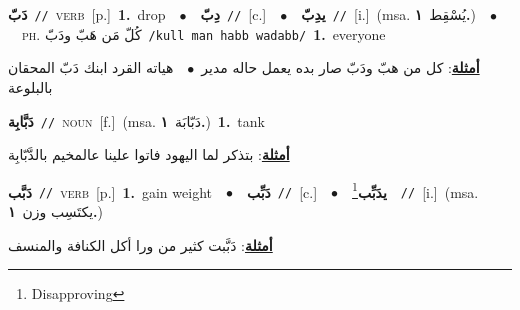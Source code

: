 \documentclass[10pt,a4paper,twoside]{article} %
\begin{document}
\begin{multicols}{2}
{\setlength\topsep{0pt}\textbf{\foreignlanguage{arabic}{دَبّ}}\ {\color{gray}\texttt{//}\color{black}}\ \textsc{verb}\ [p.]\ \textbf{1.}~drop\ \ $\bullet$\ \ \setlength\topsep{0pt}\textbf{\foreignlanguage{arabic}{دِبّ}}\ {\color{gray}\texttt{//}\color{black}}\ [c.]\ \ $\bullet$\ \ \setlength\topsep{0pt}\textbf{\foreignlanguage{arabic}{يدِبّ}}\ {\color{gray}\texttt{//}\color{black}}\ [i.]\ \color{gray}(msa. \foreignlanguage{arabic}{يُسْقِط}~\foreignlanguage{arabic}{\textbf{١.}})\color{black}\ \ $\bullet$\ \ \textsc{ph.} \color{gray} \foreignlanguage{arabic}{كُلّ مَن هَبّ ودَبّ}\color{black}\ {\color{gray}\texttt{/{\sffamily kull man habb wadabb}/}\color{black}}\ \textbf{1.}~everyone\  \begin{flushright}\color{gray}\foreignlanguage{arabic}{\textbf{\underline{\foreignlanguage{arabic}{أمثلة}}}: كل من هبّ ودَبّ صار بده يعمل حاله مدير\ $\bullet$\ \  هياته القرد ابنك دَبّ المحقان بالبلوعة}\end{flushright}\color{black}} \vspace{2mm}

{\setlength\topsep{0pt}\textbf{\foreignlanguage{arabic}{دَبَّابِة}}\ {\color{gray}\texttt{//}\color{black}}\ \textsc{noun}\ [f.]\ \color{gray}(msa. \foreignlanguage{arabic}{دَبّابَة}~\foreignlanguage{arabic}{\textbf{١.}})\color{black}\ \textbf{1.}~tank\  \begin{flushright}\color{gray}\foreignlanguage{arabic}{\textbf{\underline{\foreignlanguage{arabic}{أمثلة}}}: بتذكر لما اليهود فاتوا علينا عالمخيم بالدَّبّابِة}\end{flushright}\color{black}} \vspace{2mm}

{\setlength\topsep{0pt}\textbf{\foreignlanguage{arabic}{دَبَّب}}\ {\color{gray}\texttt{//}\color{black}}\ \textsc{verb}\ [p.]\ \textbf{1.}~gain weight\ \ $\bullet$\ \ \setlength\topsep{0pt}\textbf{\foreignlanguage{arabic}{دَبِّب}}\ {\color{gray}\texttt{//}\color{black}}\ [c.]\ \ $\bullet$\ \ \setlength\topsep{0pt}\textbf{\foreignlanguage{arabic}{يدَبِّب}}\footnote{Disapproving}\ \ {\color{gray}\texttt{//}\color{black}}\ [i.]\ \color{gray}(msa. \foreignlanguage{arabic}{يكتَسِب وزن}~\foreignlanguage{arabic}{\textbf{١.}})\color{black}\  \begin{flushright}\color{gray}\foreignlanguage{arabic}{\textbf{\underline{\foreignlanguage{arabic}{أمثلة}}}: دَبَّبت كثير من ورا أكل الكنافة والمنسف}\end{flushright}\color{black}} \vspace{2mm}


\end{multicols}
\end{document}
